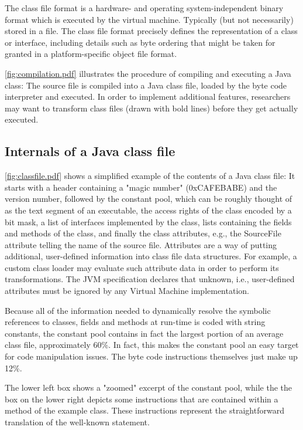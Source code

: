 The class file format is a hardware- and operating system-independent binary
format which is executed by the virtual machine. Typically (but not necessarily)
stored in a file. The class file format precisely defines the representation of a
class or interface, including details such as byte ordering that might be taken
for granted in a platform-specific object file format.

\autoref{fig:compilation.pdf} illustrates the procedure of compiling and
executing a Java class: The source file is compiled into a Java class file,
loaded by the byte code interpreter and executed. In order to implement
additional features, researchers may want to transform class files (drawn with
bold lines) before they get actually executed.

\subsection{Internals of a Java class file~\cite{BCEL}}
\autoref{fig:classfile.pdf} shows a simplified example of the contents of a
Java class file: It starts with a header containing a "magic number"
(0xCAFEBABE) and the version number, followed by the constant pool, which can be
roughly thought of as the text segment of an executable, the access rights of
the class encoded by a bit mask, a list of interfaces implemented by the class,
lists containing the fields and methods of the class, and finally the class
attributes, e.g., the SourceFile attribute telling the name of the source file.
Attributes are a way of putting additional, user-defined information into class
file data structures. For example, a custom class loader may evaluate such
attribute data in order to perform its transformations. The JVM specification
declares that unknown, i.e., user-defined attributes must be ignored by any
Virtual Machine implementation.

Because all of the information needed to dynamically resolve the symbolic
references to classes, fields and methods at run-time is coded with string
constants, the constant pool contains in fact the largest portion of an average
class file, approximately 60\%. In fact, this makes the constant pool an easy
target for code manipulation issues. The byte code instructions themselves just
make up 12\%. 

The lower left box shows a "zoomed" excerpt of the constant pool, while the
the box on the lower right depicts some instructions that are contained within a method
of the example class. These instructions represent the straightforward
translation of the well-known  statement.

